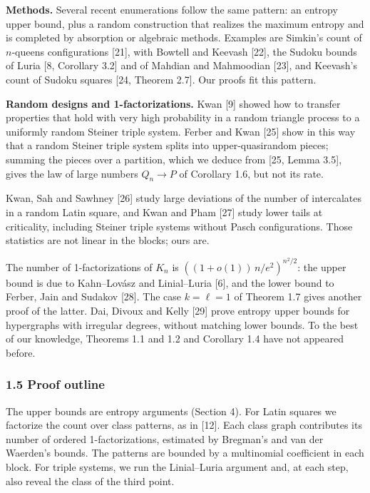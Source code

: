 \documentclass[english,11pt,a4paper]{article}
\begin{document}
\textbf{Methods.} Several recent enumerations follow the same pattern: an entropy upper bound, plus a random construction that realizes the maximum entropy and is completed by absorption or algebraic methods. Examples are Simkin's count of \(n\)-queens configurations {[}21{]}, with Bowtell and Keevash {[}22{]}, the Sudoku bounds of Luria {[}8, Corollary 3.2{]} and of Mahdian and Mahmoodian {[}23{]}, and Keevash's count of Sudoku squares {[}24, Theorem 2.7{]}. Our proofs fit this pattern.

\textbf{Random designs and 1-factorizations.} Kwan {[}9{]} showed how to transfer properties that hold with very high probability in a random triangle process to a uniformly random Steiner triple system. Ferber and Kwan {[}25{]} show in this way that a random Steiner triple system splits into upper-quasirandom pieces; summing the pieces over a partition, which we deduce from {[}25, Lemma 3.5{]}, gives the law of large numbers \(Q_n\to P\) of Corollary 1.6, but not its rate.

Kwan, Sah and Sawhney {[}26{]} study large deviations of the number of intercalates in a random Latin square, and Kwan and Pham {[}27{]} study lower tails at criticality, including Steiner triple systems without Pasch configurations. Those statistics are not linear in the blocks; ours are.

The number of 1-factorizations of \(K_n\) is \(((1+o(1))\,n/e^2)^{n^2/2}\): the upper bound is due to Kahn--Lovász and Linial--Luria {[}6{]}, and the lower bound to Ferber, Jain and Sudakov {[}28{]}. The case \(k=\ell=1\) of Theorem 1.7 gives another proof of the latter. Dai, Divoux and Kelly {[}29{]} prove entropy upper bounds for hypergraphs with irregular degrees, without matching lower bounds. To the best of our knowledge, Theorems 1.1 and 1.2 and Corollary 1.4 have not appeared before.

\subsubsection{1.5 Proof outline}\label{proof-outline}

The upper bounds are entropy arguments (Section 4). For Latin squares we factorize the count over class patterns, as in {[}12{]}. Each class graph contributes its number of ordered 1-factorizations, estimated by Bregman's and van der Waerden's bounds. The patterns are bounded by a multinomial coefficient in each block. For triple systems, we run the Linial--Luria argument and, at each step, also reveal the class of the third point.
\end{document}
